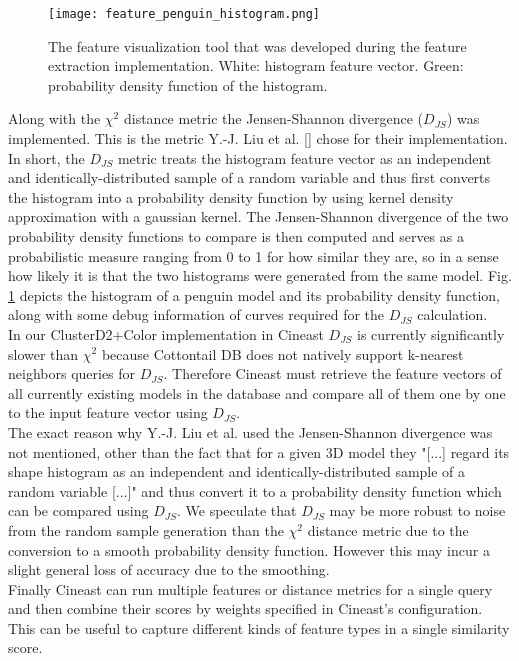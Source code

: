 \begin{figure}
\centering
\captionsetup{width=0.8\textwidth}
\texttt{[image: feature\_penguin\_histogram.png]}
\caption{The feature visualization tool that was developed during the feature extraction implementation. White: histogram feature vector. Green: probability density function of the histogram.}
\label{fig:feature_penguin_histogram}
\end{figure}

Along with the $\chi^2$ distance metric the Jensen-Shannon divergence ($D_{JS}$) was implemented. This is the metric Y.-J. Liu et al. [] chose for their implementation. In short, the $D_{JS}$ metric treats the histogram feature vector as an independent and identically-distributed sample of a random variable and thus first converts the histogram into a probability density function by using kernel density approximation with a gaussian kernel. The Jensen-Shannon divergence of the two probability density functions to compare is then computed and serves as a probabilistic measure ranging from 0 to 1 for how similar they are, so in a sense how likely it is that the two histograms were generated from the same model. Fig. \ref{fig:feature_penguin_histogram} depicts the histogram of a penguin model and its probability density function, along with some debug information of curves required for the $D_{JS}$ calculation.\\
In our ClusterD2+Color implementation in Cineast $D_{JS}$ is currently significantly slower than $\chi^2$ because Cottontail DB does not natively support k-nearest neighbors queries for $D_{JS}$. Therefore Cineast must retrieve the feature vectors of all currently existing models in the database and compare all of them one by one to the input feature vector using $D_{JS}$.\\
The exact reason why Y.-J. Liu et al. used the Jensen-Shannon divergence was not mentioned, other than the fact that for a given 3D model they "[...] regard its shape histogram as an independent and identically-distributed sample of a random variable [...]" and thus convert it to a probability density function which can be compared using $D_{JS}$. We speculate that $D_{JS}$ may be more robust to noise from the random sample generation than the $\chi^2$ distance metric due to the conversion to a smooth probability density function. However this may incur a slight general loss of accuracy due to the smoothing.\\
Finally Cineast can run multiple features or distance metrics for a single query and then combine their scores by weights specified in Cineast's configuration. This can be useful to capture different kinds of feature types in a single similarity score.


